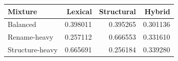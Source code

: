 \begin{tabular}{@{}lrrr@{}}
\toprule
Mixture & Lexical & Structural & Hybrid \\
\midrule
Balanced & 0.398011 & 0.395265 & 0.301136 \\
Rename-heavy & 0.257112 & 0.666553 & 0.331610 \\
Structure-heavy & 0.665691 & 0.256184 & 0.339280 \\
\bottomrule
\end{tabular}
